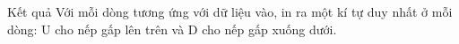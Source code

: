 Kết quả
Với mỗi dòng tương ứng với dữ liệu vào, in ra một kí tự duy nhất ở mỗi dòng: U cho nếp gấp lên trên và D cho nếp gấp xuống dưới.